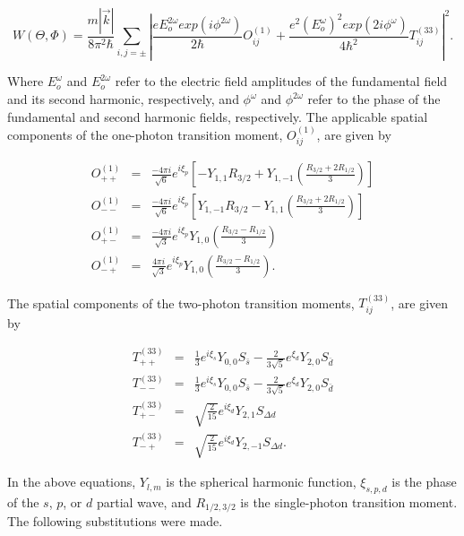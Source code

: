 \begin{equation}
\label{angdist} W (\Theta,\Phi) = \frac{m \left| \vec{k}
\right|}{8\pi^2\hbar} \sum_{i,j=\pm} \left| \frac{eE_o^{2\omega}
exp(i\phi^{2\omega})}{2\hbar}O_{ij}^{(1)} +
\frac{e^2(E_o^{\omega})^2
exp(2i\phi^{\omega})}{4\hbar^2}T_{ij}^{(33)}  \right|^2.
\end{equation}

Where $E_o^{\omega}$ and $E_o^{2\omega}$ refer to the electric
field amplitudes of the fundamental field and its second harmonic,
respectively, and $\phi^{\omega}$ and $\phi^{2\omega}$ refer to
the phase of the fundamental and second harmonic fields,
respectively. The applicable spatial components of the one-photon
transition moment, $O_{ij}^{(1)}$, are given by

\begin{eqnarray}
O_{++}^{(1)} &=& \frac{-4\pi i}{\sqrt{6}} e^{i\xi_p} \left[
-Y_{1,1}R_{3/2} + Y_{1,-1} \left(\frac{R_{3/2} + 2R_{1/2}}{3}
\right) \right] \\
O_{--}^{(1)} &=& \frac{-4\pi i}{\sqrt{6}} e^{i\xi_p} \left[
Y_{1,-1}R_{3/2} - Y_{1,1} \left(\frac{R_{3/2} + 2R_{1/2}}{3}
\right) \right] \\
O_{+-}^{(1)} &=& \frac{-4\pi i}{\sqrt{3}} e^{i\xi_p} Y_{1,0}
\left( \frac{R_{3/2} - R_{1/2}}{3} \right) \\
O_{-+}^{(1)} &=& \frac{4\pi i}{\sqrt{3}} e^{i\xi_p} Y_{1,0} \left(
\frac{R_{3/2} - R_{1/2}}{3} \right).
\end{eqnarray}

The spatial components of the two-photon transition moments,
$T_{ij}^{(33)}$, are given by

\begin{eqnarray}
T_{++}^{(33)} &=& \frac{1}{3}e^{i \xi_s}Y_{0,0}S_{\bar{s}} -
\frac{2}{3\sqrt{5}}e^{\xi_d}Y_{2,0}S_{\bar{d}} \\
T_{--}^{(33)} &=& \frac{1}{3}e^{i \xi_s}Y_{0,0}S_{\bar{s}} -
\frac{2}{3\sqrt{5}}e^{\xi_d}Y_{2,0}S_{\bar{d}} \\
T_{+-}^{(33)}&=&
\sqrt{\frac{2}{15}} e^{i\xi_d} Y_{2,1} S_{\Delta d} \\
T_{-+}^{(33)} &=& \sqrt{\frac{2}{15}} e^{i\xi_d} Y_{2,-1}
S_{\Delta d}.
\end{eqnarray}

In the above equations, $Y_{l,m}$ is the spherical harmonic
function, $\xi_{s,p,d}$ is the phase of the $s$, $p$, or $d$
partial wave, and $R_{1/2, 3/2}$ is the single-photon transition
moment. The following substitutions were made.

